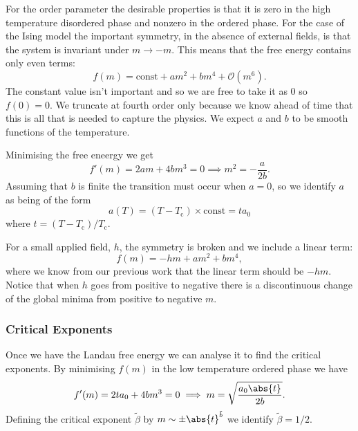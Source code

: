 \documentclass[fleqn]{NotesClass}
\newcommand*{\order}{\mathcal{O}}
\begin{document}
    For the order parameter the desirable properties is that it is zero in the high temperature disordered phase and nonzero in the ordered phase.
    For the case of the Ising model the important symmetry, in the absence of external fields, is that the system is invariant under \(m \to -m\).
    This means that the free energy contains only even terms:
    \begin{equation}
        f(m) = \mathrm{const} + am^2 + bm^4 + \order(m^6).
    \end{equation}
    The constant value isn't important and so we are free to take it as \(0\) so \(f(0) = 0\).
    We truncate at fourth order only because we know ahead of time that this is all that is needed to capture the physics.
    We expect \(a\) and \(b\) to be smooth functions of the temperature.
    
    Minimising the free eneergy we get
    \begin{equation}
        f'(m) = 2am + 4bm^3 = 0 \implies m^2 = -\frac{a}{2b}.
    \end{equation}
    Assuming that \(b\) is finite the transition must occur when \(a = 0\), so we identify \(a\) as being of the form
    \begin{equation}
        a(T) = (T - T_{\mathrm{c}})\times\mathrm{const} = ta_0
    \end{equation}
    where \(t = (T - T_{\mathrm{c}})/T_{\mathrm{c}}\).
    
    For a small applied field, \(h\), the symmetry is broken and we include a linear term:
    \begin{equation}
        f(m) = -hm + am^2 + bm^4,
    \end{equation}
    where we know from our previous work that the linear term should be \(-hm\).
    Notice that when \(h\) goes from positive to negative there is a discontinuous change of the global minima from positive to negative \(m\).
    
    \subsubsection{Critical Exponents}
    Once we have the Landau free energy we can analyse it to find the critical exponents.
    By minimising \(f(m)\) in the low temperature ordered phase we have
    \begin{equation}
        f'(m) = 2ta_{0} + 4bm^3 = 0 \implies m = \sqrt{\frac{a_0\abs{t}}{2b}}.
    \end{equation}
    Defining the critical exponent \(\tilde{\beta}\) by \(m \sim \pm \abs{t}^{\tilde{b}}\) we identify \(\tilde{\beta} = 1/2\).
    
\end{document}

